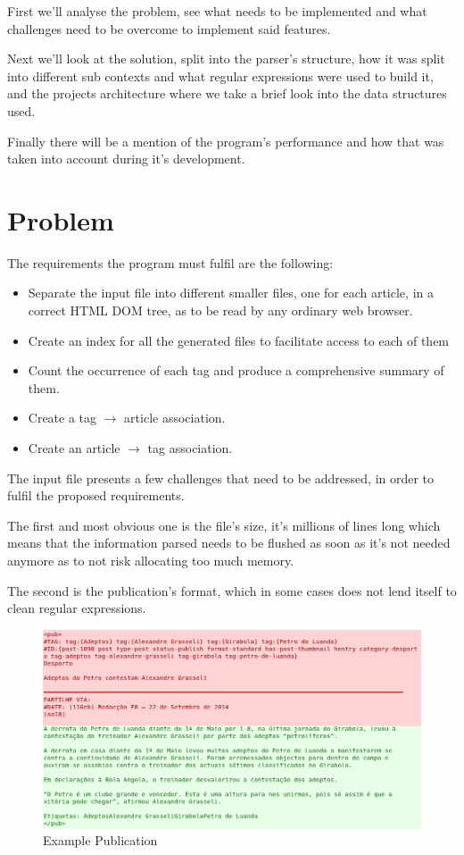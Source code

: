 \documentclass[a4paper]{report}
\begin{document}
First we'll analyse the problem, see what needs to be implemented and what
challenges need to be overcome to implement said features.

Next we'll look at the solution, split into the parser's structure, how it was
split into different sub contexts and what regular expressions were used to
build it, and the projects architecture where we take a brief look into the
data structures used.

Finally there will be a mention of the program's performance and how that was
taken into account during it's development.

\chapter{Problem}

The requirements the program must fulfil are the following:
\begin{itemize}
    \item Separate the input file into different smaller files, one for each
        article, in a correct HTML DOM tree, as to be read by any ordinary web
        browser.
    \item Create an index for all the generated files to facilitate access to
        each of them
    \item Count the occurrence of each tag and produce a comprehensive summary
        of them.
    \item Create a tag $\to$ article association.
    \item Create an article $\to$ tag association.
\end{itemize}

The input file presents a few challenges that need to be addressed, in order to fulfil the proposed requirements.

The first and most obvious one is the file's size, it's millions of lines long
which means that the information parsed needs to be flushed as soon as it's not
needed anymore as to not risk allocating too much memory.

The second is the publication's format, which in some cases does not lend
itself to clean regular expressions.

\begin{figure}[H]
    \includegraphics[width=\textwidth]{./example_pub_colored_simple.png}
    \caption{Example Publication}\label{fig:example_pub_simple}
\end{figure}
\end{document}
